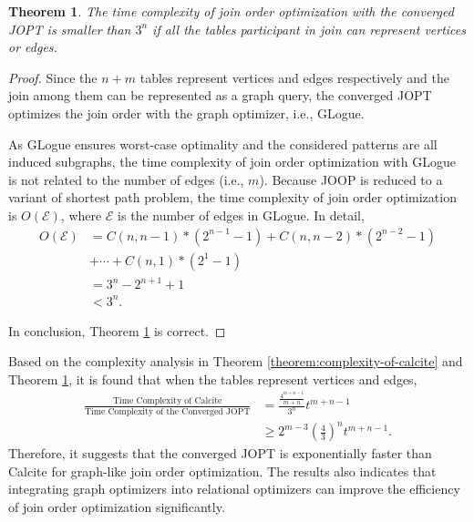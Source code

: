 \documentclass[sigconf, nonacm]{acmart}
\newtheorem{theorem}{Theorem}
\begin{document}
\begin{theorem}
    \label{theorem:complexity-of-glogue}
    The time complexity of join order optimization with the converged JOPT is smaller than $3^n$ if all the tables participant in join can represent vertices or edges.
\end{theorem}
\begin{proof}
    Since the $n + m$ tables represent vertices and edges respectively and the join among them can be represented as a graph query, the converged JOPT optimizes the join order with the graph optimizer, i.e., GLogue.

    As GLogue ensures worst-case optimality and the considered patterns are all induced subgraphs, the time complexity of join order optimization with GLogue is not related to the number of edges (i.e., $m$).
    Because JOOP is reduced to a variant of shortest path problem, the time complexity of join order optimization is $O(\mathcal{E})$, where $\mathcal{E}$ is the number of edges in GLogue.
    In detail, 
    \begin{equation*}
        \begin{split}
            O(\mathcal{E}) & = C(n, n-1)*(2^{n-1}-1) + C(n, n-2) * (2^{n-2}- 1) \\
            & + \cdots + C(n, 1) * (2^1 - 1) \\
            & = 3^n - 2^{n+1} +1 \\
            & < 3^n.
        \end{split}
    \end{equation*}
    
    In conclusion, Theorem \ref{theorem:complexity-of-glogue} is correct.

\end{proof}

Based on the complexity analysis in Theorem \ref{theorem:complexity-of-calcite} and Theorem \ref{theorem:complexity-of-glogue}, it is found that when the tables represent vertices and edges, 
\begin{equation*}
    \begin{split}
        \frac{\text{Time Complexity of Calcite}}{\text{Time Complexity of the Converged JOPT}} & = \frac{\frac{4^{m+n-1}}{m+n}}{3^n}t^{m+n-1} \\
        & \geq 2^{m-3}(\frac{4}{3})^nt^{m+n-1}.
    \end{split}
\end{equation*}
Therefore, it suggests that the converged JOPT is exponentially faster than Calcite for graph-like join order optimization.
The results also indicates that integrating graph optimizers into relational optimizers can improve the efficiency of join order optimization significantly.
\end{document}
